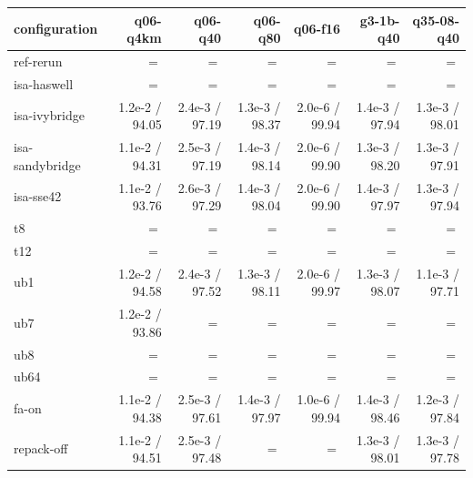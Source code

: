 \begin{tabular}{lrrrrrr}
\toprule
configuration & q06-q4km & q06-q40 & q06-q80 & q06-f16 & g3-1b-q40 & q35-08-q40\\
\midrule
ref-rerun & $=$ & $=$ & $=$ & $=$ & $=$ & $=$\\
isa-haswell & $=$ & $=$ & $=$ & $=$ & $=$ & $=$\\
isa-ivybridge & 1.2e-2 / 94.05 & 2.4e-3 / 97.19 & 1.3e-3 / 98.37 & 2.0e-6 / 99.94 & 1.4e-3 / 97.94 & 1.3e-3 / 98.01\\
isa-sandybridge & 1.1e-2 / 94.31 & 2.5e-3 / 97.19 & 1.4e-3 / 98.14 & 2.0e-6 / 99.90 & 1.3e-3 / 98.20 & 1.3e-3 / 97.91\\
isa-sse42 & 1.1e-2 / 93.76 & 2.6e-3 / 97.29 & 1.4e-3 / 98.04 & 2.0e-6 / 99.90 & 1.4e-3 / 97.97 & 1.3e-3 / 97.94\\
t8 & $=$ & $=$ & $=$ & $=$ & $=$ & $=$\\
t12 & $=$ & $=$ & $=$ & $=$ & $=$ & $=$\\
ub1 & 1.2e-2 / 94.58 & 2.4e-3 / 97.52 & 1.3e-3 / 98.11 & 2.0e-6 / 99.97 & 1.3e-3 / 98.07 & 1.1e-3 / 97.71\\
ub7 & 1.2e-2 / 93.86 & $=$ & $=$ & $=$ & $=$ & $=$\\
ub8 & $=$ & $=$ & $=$ & $=$ & $=$ & $=$\\
ub64 & $=$ & $=$ & $=$ & $=$ & $=$ & $=$\\
fa-on & 1.1e-2 / 94.38 & 2.5e-3 / 97.61 & 1.4e-3 / 97.97 & 1.0e-6 / 99.94 & 1.4e-3 / 98.46 & 1.2e-3 / 97.84\\
repack-off & 1.1e-2 / 94.51 & 2.5e-3 / 97.48 & $=$ & $=$ & 1.3e-3 / 98.01 & 1.3e-3 / 97.78\\
\bottomrule
\end{tabular}
